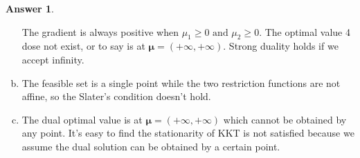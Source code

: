 \documentclass{article}
\theoremstyle{definition}
\newtheorem{ans}{Answer}
\begin{document}
\begin{ans}
\begin{enumerate}[(a)]
			The gradient is always positive when $\mu_1\geq0 \text{ and }\mu_2\geq0$. The optimal value 4 dose not exist, or to say is at $\boldsymbol{\mu}=(+\infty, +\infty)$. Strong duality holds if we accept infinity.
			
			\item The feasible set is a single point while the two restriction functions are not affine, so the Slater’s condition doesn’t hold.
			
			\item The dual optimal value is at $\boldsymbol{\mu}=(+\infty, +\infty)$ which cannot be obtained by any point. It's easy to find the stationarity of KKT is not satisfied because we assume the dual solution can be obtained by a certain point. 
		\end{enumerate}
	\end{ans}
\end{document}
